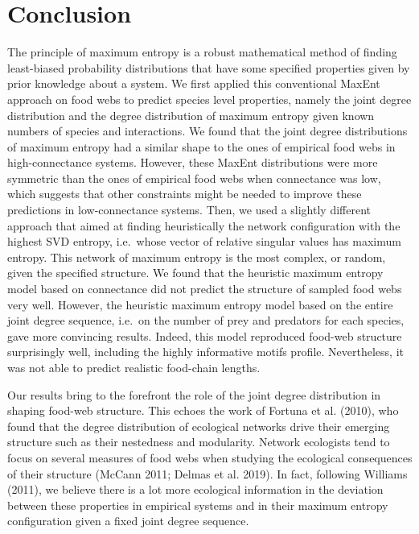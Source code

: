\documentclass[11pt]{article}
\begin{document}
\hypertarget{conclusion}{%
\section{Conclusion}\label{conclusion}}

The principle of maximum entropy is a robust mathematical method of
finding least-biased probability distributions that have some specified
properties given by prior knowledge about a system. We first applied
this conventional MaxEnt approach on food webs to predict species level
properties, namely the joint degree distribution and the degree
distribution of maximum entropy given known numbers of species and
interactions. We found that the joint degree distributions of maximum
entropy had a similar shape to the ones of empirical food webs in
high-connectance systems. However, these MaxEnt distributions were more
symmetric than the ones of empirical food webs when connectance was low,
which suggests that other constraints might be needed to improve these
predictions in low-connectance systems. Then, we used a slightly
different approach that aimed at finding heuristically the network
configuration with the highest SVD entropy, i.e.~whose vector of
relative singular values has maximum entropy. This network of maximum
entropy is the most complex, or random, given the specified structure.
We found that the heuristic maximum entropy model based on connectance
did not predict the structure of sampled food webs very well. However,
the heuristic maximum entropy model based on the entire joint degree
sequence, i.e.~on the number of prey and predators for each species,
gave more convincing results. Indeed, this model reproduced food-web
structure surprisingly well, including the highly informative motifs
profile. Nevertheless, it was not able to predict realistic food-chain
lengths.

Our results bring to the forefront the role of the joint degree
distribution in shaping food-web structure. This echoes the work of
Fortuna et al. (2010), who found that the degree distribution of
ecological networks drive their emerging structure such as their
nestedness and modularity. Network ecologists tend to focus on several
measures of food webs when studying the ecological consequences of their
structure (McCann 2011; Delmas et al. 2019). In fact, following Williams
(2011), we believe there is a lot more ecological information in the
deviation between these properties in empirical systems and in their
maximum entropy configuration given a fixed joint degree sequence.
\end{document}
